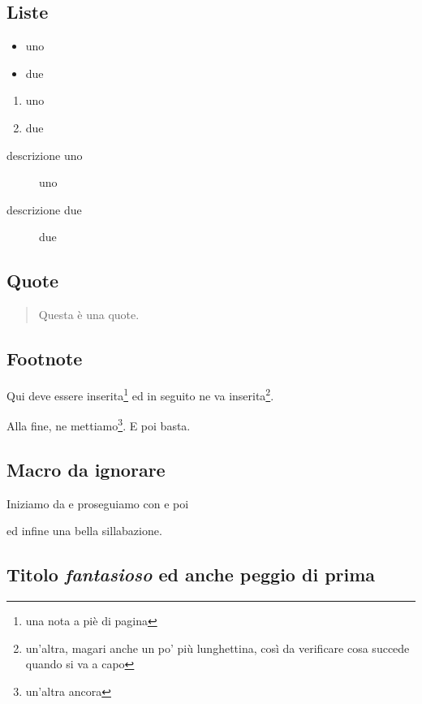 \documentclass[12pt]{book}
\begin{document}
\subsection{Liste}
\par
\begin{itemize}
\item uno
\item due
\end{itemize}
\par
\begin{enumerate}
\item uno
\item due
\end{enumerate}
\par
\begin{description}
\item[descrizione uno] uno
\item[descrizione due] due
\end{description}
\par
\subsection{Quote}
\par
\begin{quote}
Questa è una quote.
\end{quote}
\par
\subsection{Footnote}
\par
Qui deve essere inserita\footnote{una nota a piè di pagina} ed in seguito ne va
inserita\footnote{un'altra, magari anche un po' più lunghettina, così da verificare cosa
succede quando si va a capo}.
\par
Alla fine, ne mettiamo\footnote{un'altra ancora}. E poi basta.
\par
\subsection{Macro da ignorare}
\par
Iniziamo da \noindent e
proseguiamo con \newpage e
poi

\vspace{1cm}

ed
infine una bella sil\-la\-ba\-zio\-ne.
\par
\subsection{Titolo \textit{fantasioso} ed anche \textbf{peggio} di prima}
\par
\end{document}
